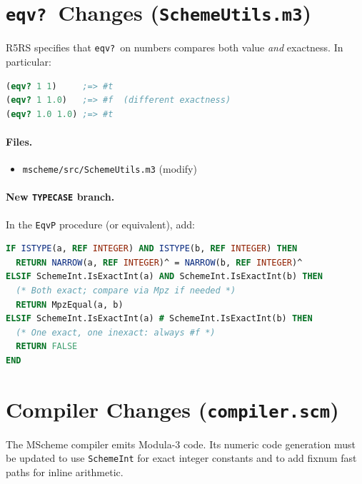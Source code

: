 \documentclass[12pt]{article}
\begin{document}
\section{{\tt eqv?}\ Changes ({\tt SchemeUtils.m3})}
\label{sec:impl-eqv}

R5RS specifies that {\tt eqv?}\ on numbers compares both value
\emph{and} exactness.  In particular:

\begin{lstlisting}[language=Scheme]
(eqv? 1 1)     ;=> #t
(eqv? 1 1.0)   ;=> #f  (different exactness)
(eqv? 1.0 1.0) ;=> #t
\end{lstlisting}

\paragraph{Files.}
\begin{itemize}[nosep]
\item {\tt mscheme/src/SchemeUtils.m3} (modify)
\end{itemize}

\paragraph{New {\tt TYPECASE} branch.}
In the {\tt EqvP} procedure (or equivalent), add:
\begin{lstlisting}[language=Modula3]
IF ISTYPE(a, REF INTEGER) AND ISTYPE(b, REF INTEGER) THEN
  RETURN NARROW(a, REF INTEGER)^ = NARROW(b, REF INTEGER)^
ELSIF SchemeInt.IsExactInt(a) AND SchemeInt.IsExactInt(b) THEN
  (* Both exact; compare via Mpz if needed *)
  RETURN MpzEqual(a, b)
ELSIF SchemeInt.IsExactInt(a) # SchemeInt.IsExactInt(b) THEN
  (* One exact, one inexact: always #f *)
  RETURN FALSE
END
\end{lstlisting}

\section{Compiler Changes ({\tt compiler.scm})}
\label{sec:impl-compiler}

The MScheme compiler emits Modula-3 code.  Its numeric code
generation must be updated to use {\tt SchemeInt} for exact
integer constants and to add fixnum fast paths for inline
arithmetic.
\end{document}

